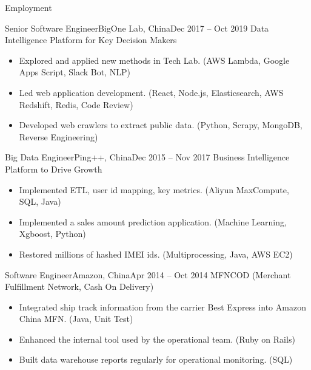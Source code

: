 \documentclass[]{mcdowellcv}
\begin{document}
	\makeheader
	
	\begin{cvsection}{Employment}
		\begin{cvsubsection}{Senior Software Engineer}{BigOne Lab, China}{Dec 2017 – Oct 2019}
			Data Intelligence Platform for Key Decision Makers
			\begin{itemize}
				\item Explored and applied new methods in Tech Lab. (AWS Lambda, Google Apps Script, Slack Bot, NLP)
				\item Led web application development. (React, Node.js, Elasticsearch, AWS Redshift, Redis, Code Review)
				\item Developed web crawlers to extract public data. (Python, Scrapy, MongoDB, Reverse Engineering)
			\end{itemize}
		\end{cvsubsection}

		\begin{cvsubsection}{Big Data Engineer}{Ping++, China}{Dec 2015 – Nov 2017}
			Business Intelligence Platform to Drive Growth
			\begin{itemize}
				\item Implemented ETL, user id mapping, key metrics. (Aliyun MaxCompute, SQL, Java)
				\item Implemented a sales amount prediction application. (Machine Learning, Xgboost, Python)
				\item Restored millions of hashed IMEI ids. (Multiprocessing, Java, AWS EC2)
			\end{itemize}
		\end{cvsubsection}
		
		\begin{cvsubsection}{Software Engineer}{Amazon, China}{Apr 2014 – Oct 2014}
			MFNCOD (Merchant Fulfillment Network, Cash On Delivery)
			\begin{itemize}
				\item Integrated ship track information from the carrier Best Express into Amazon China MFN. (Java, Unit Test)
				\item Enhanced the internal tool used by the operational team. (Ruby on Rails)
				\item Built data warehouse reports regularly for operational monitoring. (SQL)
			\end{itemize}
		\end{cvsubsection}
		

\end{cvsection}
\end{document}
